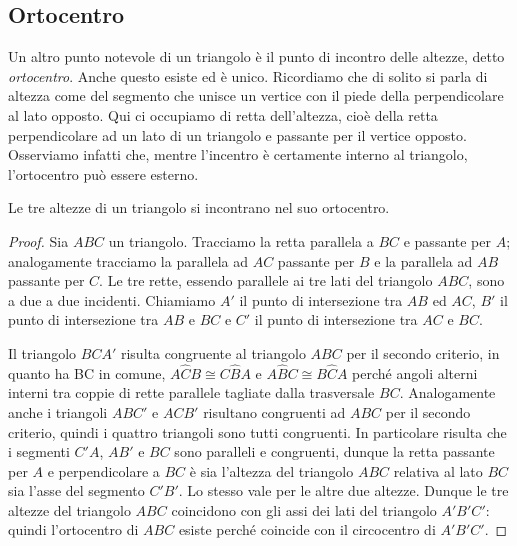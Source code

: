 \subsection{Ortocentro}

Un altro punto notevole di un triangolo è il punto di incontro delle altezze, detto \emph{ortocentro}. Anche questo esiste ed è unico. Ricordiamo che di solito si parla di altezza come del segmento che unisce un vertice con il piede della perpendicolare al lato opposto. Qui ci occupiamo di retta dell'altezza, cioè della retta perpendicolare ad un lato di un triangolo e passante per il vertice opposto. Osserviamo infatti che, mentre l'incentro è certamente interno al triangolo, l'ortocentro può essere esterno.

\begin{teorema}
Le tre altezze di un triangolo si incontrano nel suo ortocentro.
\end{teorema}


\begin{proof}
Sia $ABC$ un triangolo. Tracciamo la retta parallela a $BC$ e passante per $A$; analogamente tracciamo la parallela ad $AC$ passante per $B$ e la parallela ad $AB$ passante per $C$. Le tre rette, essendo parallele ai tre lati del triangolo $ABC$, sono a due a due incidenti. Chiamiamo $A'$ il punto di intersezione tra $AB$ ed $AC$, $B'$ il punto di intersezione tra $AB$ e $BC$ e $C'$ il punto di intersezione tra $AC$ e $BC$.

Il triangolo $BCA'$ risulta congruente al triangolo $ABC$ per il secondo criterio, in quanto ha BC in comune, $A\widehat{C}B\cong C\widehat{B}A$ e $A\widehat{B}C\cong B\widehat{C}A$ perché angoli alterni interni tra coppie di rette parallele tagliate dalla trasversale $BC$. Analogamente anche i triangoli $ABC'$ e $ACB'$ risultano congruenti ad $ABC$ per il secondo criterio, quindi i quattro triangoli sono tutti congruenti. In particolare risulta che i segmenti $C'A$, $AB'$ e $BC$ sono paralleli e congruenti, dunque la retta passante per $A$ e perpendicolare a $BC$ è sia l'altezza del triangolo $ABC$ relativa al lato $BC$ sia l'asse del segmento $C'B'$. Lo stesso vale per le altre due altezze. Dunque le tre altezze del triangolo $ABC$ coincidono con gli assi dei lati del triangolo $A'B'C'$: quindi l'ortocentro di $ABC$ esiste perché coincide con il circocentro di $A'B'C'$.
\end{proof}

